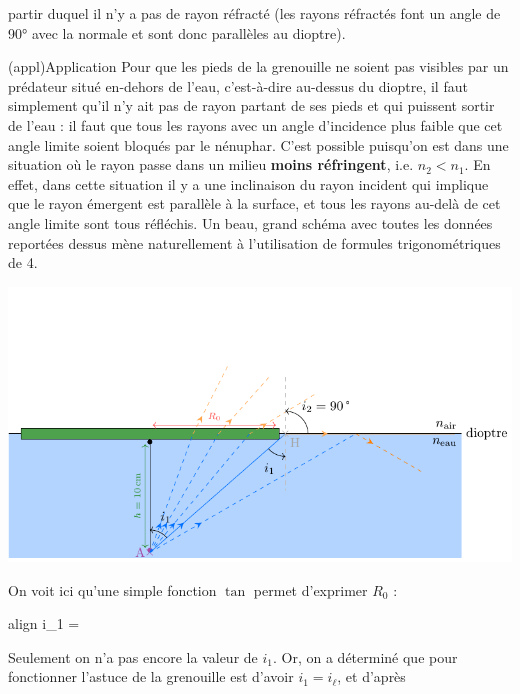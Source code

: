 \documentclass[a4paper, 11pt, oneside]{book}
\begin{document}
{\begin{tcbraster}[raster columns=7, raster equal height=rows]
\begin{tcolorbox}[blankest, raster multicolumn=3, space to=\myspace]
\begin{tcbraster}[raster columns=1]
\begin{tcb}
					partir duquel il n'y a pas de rayon réfracté (les rayons
					réfractés font un angle de 90° avec la normale et sont donc
					parallèles au dioptre).
				\end{tcb}
			\end{tcbraster}
		\end{tcolorbox}
	\end{tcbraster}
	\begin{tcb}[breakable](appl){Application}
		Pour que les pieds de la grenouille ne soient pas visibles par un prédateur
		situé en-dehors de l'eau, c'est-à-dire au-dessus du dioptre, il faut
		simplement qu'il n'y ait pas de rayon partant de ses pieds et qui puissent
		sortir de l'eau : il faut que tous les rayons avec un angle d'incidence plus
		faible que cet angle limite soient bloqués par le nénuphar. C'est possible
		puisqu'on est dans une situation où le rayon passe dans un milieu
		\textbf{moins réfringent}, i.e. $n_2 < n_1$. En effet, dans cette situation
		il y a une inclinaison du rayon incident qui implique que le rayon émergent
		est parallèle à la surface, et tous les rayons au-delà de cet angle limite
		sont tous réfléchis. Un beau, grand schéma avec toutes les données reportées
		dessus mène naturellement à l'utilisation de formules trigonométriques de
		4\ieme.
		\begin{center}
			\vspace*{-2.5cm}
			\includegraphics{../figures/grenouille_full}
		\end{center}
		On voit ici qu'une simple fonction $\tan$ permet d'exprimer $R_0$ :
		\begin{empheq}[box=\fbox]{align}\label{eq:tan}
			\tan i_1 = 
		\end{empheq}
		Seulement on n'a pas encore la valeur de $i_1$. Or, on a déterminé que pour
		fonctionner l'astuce de la grenouille est d'avoir $i_1 = i_\ell$, et d'après

\end{tcb}}
\end{document}
